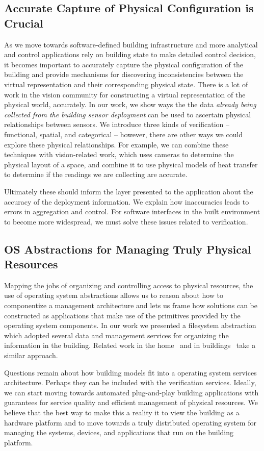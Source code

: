 \subsection{Accurate Capture of Physical Configuration is Crucial}
As we move towards software-defined building infrastructure and more analytical and control applications rely on building 
state to make detailed control decision, it becomes important to accurately capture the physical configuration of the building
and provide mechanisms for discovering inconsistencies between the virtual representation and their corresponding physical state.
There is a lot of work in the vision community for constructing a virtual representation of the physical world, accurately.
In our work, we show ways the the data \emph{already being collected from the building sensor deployment} can be used to
ascertain physical relationships between sensors.  We introduce three kinds of verification -- functional, spatial, and categorical --
however, there are other ways we could explore these physical relationships.  For example, we can combine 
these techniques with vision-related work, which uses cameras to determine the physical layout of a space, and combine
it to use physical models of heat transfer to determine if the readings we are collecting are accurate.

Ultimately these should inform the layer presented to the application about the accuracy of the deployment information.  We
explain how inaccuracies leads to errors in aggregation and control.  For software interfaces in the built environment
to become more widespread, we must solve these issues related to verification.


\subsection{OS Abstractions for Managing Truly Physical Resources}
Mapping the jobs of organizing and controlling access to physical resources, the use of operating system abstractions
allows us to reason about how to componentize a management architecture and lets us frame how solutions can 
be constructed as applications that make use of the primitives provided by the operating system components.
In our work we presented a filesystem abstraction which adopted several data and management services for organizing
the information in the building.  Related work in the home~\cite{homeos} and in buildings~\cite{boss} take a similar
approach.

Questions remain about how building models fit into a operating system services architecture.  Perhaps they can be
included with the verification services.  Ideally, we can start moving towards automated plug-and-play building applications
with guarantees for service quality and efficient management of physical resources.  We believe that the best way to
make this a reality it to view the building as a hardware platform and to move towards a truly distributed operating system
for managing the systems, devices, and applications that run on the building platform.



